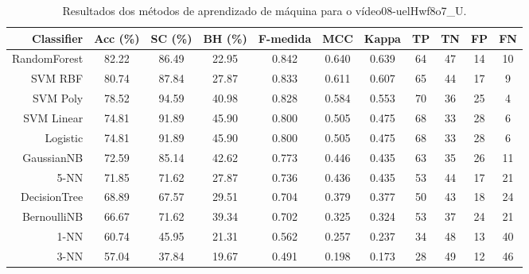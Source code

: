 \begin{table}[!htb]
\centering
\caption{Resultados dos métodos de aprendizado de máquina para o vídeo08-uelHwf8o7_U.}
\label{tab:08-uelHwf8o7_U}
\begin{tabular}{r|c|c|c|c|c|c|c|c|c|c}
\hline\hline
Classifier & Acc (\%) & SC (\%) & BH (\%) & F-medida & MCC & Kappa & TP & TN & FP & FN \\ \hline
RandomForest & 82.22 & 86.49 & 22.95 & 0.842 & 0.640 & 0.639 & 64 & 47 & 14 & 10 \\ 
SVM RBF & 80.74 & 87.84 & 27.87 & 0.833 & 0.611 & 0.607 & 65 & 44 & 17 & 9 \\ 
SVM Poly & 78.52 & 94.59 & 40.98 & 0.828 & 0.584 & 0.553 & 70 & 36 & 25 & 4 \\ 
SVM Linear & 74.81 & 91.89 & 45.90 & 0.800 & 0.505 & 0.475 & 68 & 33 & 28 & 6 \\ 
Logistic & 74.81 & 91.89 & 45.90 & 0.800 & 0.505 & 0.475 & 68 & 33 & 28 & 6 \\ 
GaussianNB & 72.59 & 85.14 & 42.62 & 0.773 & 0.446 & 0.435 & 63 & 35 & 26 & 11 \\ 
5-NN & 71.85 & 71.62 & 27.87 & 0.736 & 0.436 & 0.435 & 53 & 44 & 17 & 21 \\ 
DecisionTree & 68.89 & 67.57 & 29.51 & 0.704 & 0.379 & 0.377 & 50 & 43 & 18 & 24 \\ 
BernoulliNB & 66.67 & 71.62 & 39.34 & 0.702 & 0.325 & 0.324 & 53 & 37 & 24 & 21 \\ 
1-NN & 60.74 & 45.95 & 21.31 & 0.562 & 0.257 & 0.237 & 34 & 48 & 13 & 40 \\ 
3-NN & 57.04 & 37.84 & 19.67 & 0.491 & 0.198 & 0.173 & 28 & 49 & 12 & 46 \\ 
\hline\hline
\end{tabular}
\end{table}
